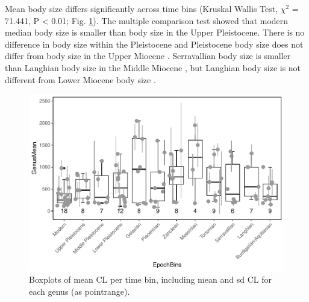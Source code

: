 \FloatBarrier




Mean body size differs significantly across time bins (Kruskal Wallis Test, $\chi^2$ = 71.441, P < 0.01; Fig. \ref{fig:boxBins}). 
The multiple comparison test showed that modern median body size is smaller than body size in the Upper Pleistocene. %
There is no difference in body size within the Pleistocene %
and Pleistocene body size does not differ from body size in the Upper Miocene%
. Serravallian body size is smaller than Langhian body size in the Middle Miocene%
, but Langhian body size is not different from Lower Miocene body size%
.


\begin{figure}[hbtp]
	\centering
	\includegraphics{MA_JJ_files/figure-latex/BPGBins-1.pdf}
	\caption{Boxplots of mean CL per time bin, including mean and sd CL for
		each genus (as pointrange).}
	\label{fig:boxBins}
\end{figure}













